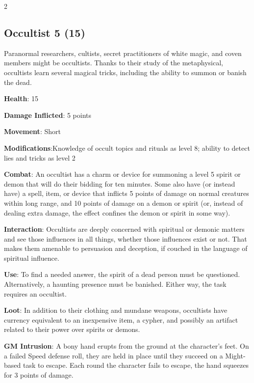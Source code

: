 \begin{multicols}{2}
\subsection{Occultist	5 (15)}

Paranormal researchers, cultists, secret practitioners of white magic, and coven members might be occultists. Thanks to their study of the metaphysical, occultists learn several magical tricks, including the ability to summon or banish the dead.

\textbf{Health}: 15

\textbf{Damage Inflicted}: 5 points

\textbf{Movement}: Short

\textbf{Modifications}:Knowledge of occult topics and rituals as level 8; ability to detect lies and tricks as level 2

\textbf{Combat}: An occultist has a charm or device for summoning a level 5 spirit or demon that will do their bidding for ten minutes. Some also have (or instead have) a spell, item, or device that inflicts 5 points of damage on normal creatures within long range, and 10 points of damage on a demon or spirit (or, instead of dealing extra damage, the effect confines the demon or spirit in some way).

\textbf{Interaction}: Occultists are deeply concerned with spiritual or demonic matters and see those influences in all things, whether those influences exist or not. That makes them amenable to persuasion and deception, if couched in the language of spiritual influence.

\textbf{Use}: To find a needed answer, the spirit of a dead person must be questioned. Alternatively, a haunting presence must be banished. Either way, the task requires an occultist.

\textbf{Loot}: In addition to their clothing and mundane weapons, occultists have currency equivalent to an inexpensive item, a cypher, and possibly an artifact related to their power over spirits or demons.

\textbf{GM Intrusion}: A bony hand erupts from the ground at the character’s feet. On a failed Speed defense roll, they are held in place until they succeed on a Might-based task to escape. Each round the character fails to escape, the hand squeezes for 3 points of damage.


\end{multicols}
